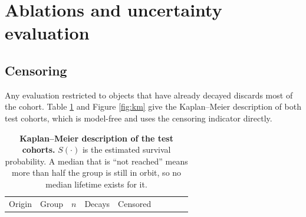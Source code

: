 \documentclass[3p,times]{elsarticle}
\begin{document}
\section{Ablations and uncertainty evaluation}\label{sec:ablations}

\subsection{Censoring}\label{censoring}

Any evaluation restricted to objects that have already decayed discards
most of the cohort. Table \ref{tbl:km} and Figure \ref{fig:km} give the
Kaplan--Meier description of both test cohorts, which is model-free and
uses the censoring indicator directly.

\begin{longtable}[]{@{}
  >{\raggedright\arraybackslash}p{}
  >{\raggedright\arraybackslash}p{}
  >{\raggedleft\arraybackslash}p{}
  >{\raggedleft\arraybackslash}p{}
  >{\raggedleft\arraybackslash}p{}
  >{\raggedleft\arraybackslash}p{}
  >{\raggedleft\arraybackslash}p{}
  >{\raggedleft\arraybackslash}p{}
  >{\raggedleft\arraybackslash}p{}@{}}
\caption{\textbf{Kaplan--Meier description of the test cohorts.}
\(S(\cdot)\) is the estimated survival probability. A median that is
``not reached'' means more than half the group is still in orbit, so no
median lifetime exists for it.}\label{tbl:km}\tabularnewline
\toprule\noalign{}
\begin{minipage}[b]{\linewidth}\raggedright
Origin
\end{minipage} & \begin{minipage}[b]{\linewidth}\raggedright
Group
\end{minipage} & \begin{minipage}[b]{\linewidth}\raggedleft
\(n\)
\end{minipage} & \begin{minipage}[b]{\linewidth}\raggedleft
Decays
\end{minipage} & \begin{minipage}[b]{\linewidth}\raggedleft
Censored
\end{minipage} & \begin{minipage}[b]{\linewidth}\raggedleft

\end{minipage}
\end{longtable}
\end{document}
